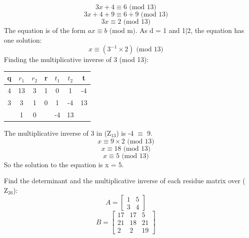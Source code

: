 \documentclass[a4paper]{exam}
\begin{document}
\begin{questions}
        \begin{solution}
            \[
                3x + 4 \equiv 6 \text{ (mod 13)}
            \]
            \[
                3x + 4 + 9 \equiv 6 + 9 \text{ (mod 13)}
            \]
            \[
                3x \equiv 2 \text{ (mod 13)}
            \]
            The equation is of the form $ax \equiv b \text{ (mod m)}$. As d = 1 and 1|2, the equation has one solution:
            \[
                x \equiv (3^{-1} \times 2) \text{ (mod 13)}
            \]
            Finding the multiplicative inverse of 3 (mod 13):
            \begin{table}[H]
                \begin{center}
                    \begin{tabular}{|c|c|c|c|c|c|c|}
                    \hline
                    \textbf{q}               & \textbf{$r_1$} & \textbf{$r_2$} & \textbf{r}               & \textbf{$t_1$} & \textbf{$t_2$} & \textbf{t}               \\ \hline
                    4                        & 13             & 3              & 1                        & 0              & 1              & -4                       \\ \hline
                    3                        & 3              & 1              & 0                        & 1              & -4             & 13                       \\ \hline
                    & 1                                       & 0              &                          & -4             & 13             &                          \\ \hline
                    \end{tabular}
                \end{center}
            \end{table}
            The multiplicative inverse of 3 in ($\text{Z}_{13}$) is -4 $\equiv$ 9.
            \[
                x \equiv 9 \times 2 \text{ (mod 13)}
            \]
            \[
                x \equiv 18 \text{ (mod 13)}
            \]
            \[
                x \equiv 5 \text{ (mod 13)}
            \]
            So the solution to the equation is x = 5.
        \end{solution}

        \question[10]
        Find the determinant and the multiplicative inverse of each residue matrix over ($\text{Z}_{26}$):\\
        \[A=
            \begin{bmatrix}
                1 & 5 \\
                3 & 4
            \end{bmatrix}
        \]
        \[B=
            \begin{bmatrix}
                17 & 17 & 5 \\
                21 & 18 & 21 \\
                2 & 2 & 19
            \end{bmatrix}
        \]
        \begin{solution}
            \begin{parts}

\end{parts}
\end{solution}
\end{questions}
\end{document}
